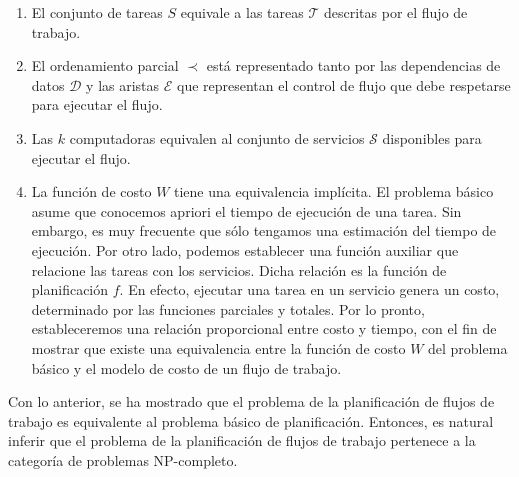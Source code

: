 \begin{enumerate}
\item El conjunto de tareas $S$ equivale a las tareas $\mathcal{T}$ descritas por el flujo de trabajo.

\item El ordenamiento parcial $\prec$ está representado tanto por las dependencias de datos $\mathcal{D}$ y las aristas $\mathcal{E}$ que representan el control de flujo que debe respetarse para ejecutar el flujo.

\item Las $k$ computadoras equivalen al conjunto de servicios $\mathcal{S}$ disponibles para ejecutar el flujo.

\item La función de costo $W$ tiene una equivalencia implícita. El problema básico asume que conocemos apriori el tiempo de ejecución de una tarea. Sin embargo, es muy frecuente que sólo tengamos una estimación del tiempo de ejecución. Por otro lado, podemos establecer una función auxiliar que relacione las tareas con los servicios. Dicha relación es la función de planificación $f$. En efecto, ejecutar una tarea en un servicio genera un costo, determinado por las funciones parciales y totales. Por lo pronto, estableceremos una relación proporcional entre costo y tiempo, con el fin de mostrar que existe una equivalencia entre la función de costo $W$ del problema básico y el modelo de costo de un flujo de trabajo.
\end{enumerate}

Con lo anterior, se ha mostrado que el problema de la planificación de flujos de trabajo es equivalente al problema básico de planificación. Entonces, es natural inferir que el problema de la planificación de flujos de trabajo pertenece a la categoría de problemas NP-completo.

